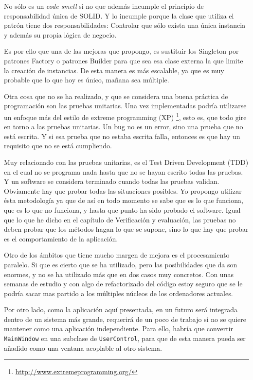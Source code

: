No s\'olo es un \emph{code smell} si no que adem\'as incumple el principio de responsabilidad \'unica de SOLID.
Y lo incumple porque la clase que utiliza el patr\'on tiene dos responsabilidades: Controlar que s\'olo exista
una \'unica instancia y adem\'as su propia l\'ogica de negocio.

Es por ello que una de las mejoras que propongo, es sustituir los Singleton por patrones
Factory o patrones Builder para que sea esa clase externa la que limite la creaci\'on de instancias.
De esta manera es m\'as escalable, ya que es muy probable que lo que hoy es \'unico, ma\~nana sea m\'ultiple.

Otra cosa que no se ha realizado, y que se considera una buena pr\'actica de programaci\'on son
las pruebas unitarias. Una vez implementadas podr\'ia utilizarse un enfoque m\'as del estilo
de extreme programming (XP) \footnote{\url{http://www.extremeprogramming.org/}}, esto es, que todo gire
en torno a las pruebas unitarias. Un bug no es un error, sino una prueba que no est\'a escrita. Y si esa 
prueba que no estaba escrita falla, entonces es que hay un requisito que no se est\'a cumpliendo.

Muy relacionado con las pruebas unitarias, es el Test Driven Development (TDD) en el cual no se programa
nada hasta que no se hayan escrito todas las pruebas. Y un software se considera terminado cuando todas las pruebas
validan. Obviamente hay que probar todas las situaciones posibles. Yo propongo utilizar \'esta metodolog\'ia ya
que de as\'i en todo momento se sabe que es lo que funciona, que es lo que no funciona, y hasta que punto ha sido
probado el software. Igual que lo que he dicho en el cap\'itulo de Verificaci\'on y evaluaci\'on, las pruebas
no deben probar que los m\'etodos hagan lo que se supone, sino lo que hay que probar es el comportamiento de la
aplicaci\'on.

Otro de los \'ambitos que tiene mucho margen de mejora es el procesamiento paralelo. Si que es cierto que se ha
utilizado, pero las posibilidades que da son enormes, y no se ha utilizado m\'as que en dos casos
muy concretos. Con unas semanas de estudio y con algo de refactorizado del c\'odigo estoy seguro
que se le podr\'ia sacar mas partido a los m\'ultiples n\'ucleos de los ordenadores actuales.

Por otro lado, como la aplicaci\'on aqu\'i presentada, en un futuro ser\'a integrada dentro de un sistema m\'as grande,
requerir\'a de un poco de trabajo si no se quiere mantener como una aplicaci\'on independiente.
Para ello, habr\'ia que convertir \texttt{MainWindow} en una subclase de \texttt{UserControl}, para
que de esta manera pueda ser a\~nadido como una ventana acoplable al otro sistema.

